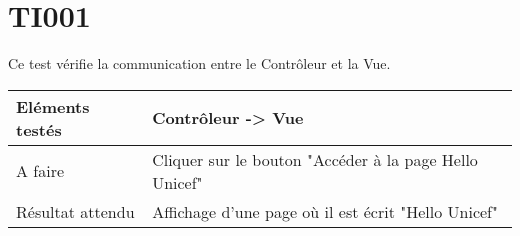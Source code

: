 
\section{TI001}
	 Ce test vérifie la communication entre le Contrôleur et la Vue.
	 \begin{center}
     	\begin{tabular}[h]{|p{}|p{}|}
		\hline
			Eléments testés & Contrôleur -> Vue \\\hline
    			A faire & Cliquer sur le bouton "Accéder à la page Hello Unicef" \\\hline
    			Résultat attendu & Affichage d'une page où il est écrit "Hello Unicef" \\\hline
     	\end{tabular}
  	\end{center}	